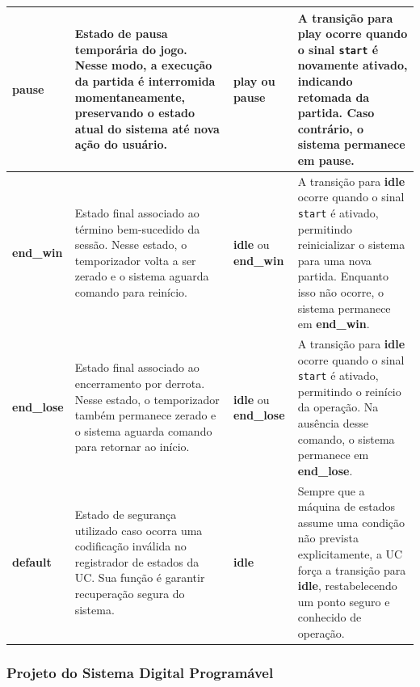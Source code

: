 \documentclass[a4paper,12pt,twoside]{article}
\begin{document}
\begin{longtable}{|>{\centering\arraybackslash}p{}|>{\centering\arraybackslash}p{}|>{\centering\arraybackslash}p{}|>{\centering\arraybackslash}p{}|}
\textbf{pause} 
& Estado de pausa temporária do jogo. Nesse modo, a execução da partida é interromida momentaneamente, preservando o estado atual do sistema até nova ação do usuário. 
& \textbf{play} ou \textbf{pause} 
& A transição para \textbf{play} ocorre quando o sinal \texttt{start} é novamente ativado, indicando retomada da partida. Caso contrário, o sistema permanece em \textbf{pause}. \\ \hline

\textbf{end\_win} 
& Estado final associado ao término bem-sucedido da sessão. Nesse estado, o temporizador volta a ser zerado e o sistema aguarda comando para reinício. 
& \textbf{idle} ou \textbf{end\_win} 
& A transição para \textbf{idle} ocorre quando o sinal \texttt{start} é ativado, permitindo reinicializar o sistema para uma nova partida. Enquanto isso não ocorre, o sistema permanece em \textbf{end\_win}. \\ \hline

\textbf{end\_lose} 
& Estado final associado ao encerramento por derrota. Nesse estado, o temporizador também permanece zerado e o sistema aguarda comando para retornar ao início. 
& \textbf{idle} ou \textbf{end\_lose} 
& A transição para \textbf{idle} ocorre quando o sinal \texttt{start} é ativado, permitindo o reinício da operação. Na ausência desse comando, o sistema permanece em \textbf{end\_lose}. \\ \hline

\textbf{default} 
& Estado de segurança utilizado caso ocorra uma codificação inválida no registrador de estados da UC. Sua função é garantir recuperação segura do sistema. 
& \textbf{idle} 
& Sempre que a máquina de estados assume uma condição não prevista explicitamente, a UC força a transição para \textbf{idle}, restabelecendo um ponto seguro e conhecido de operação. \\ \hline

\end{longtable}

\subsubsection{Projeto do Sistema Digital
Programável}\label{projeto-do-sistema-digital-programuxe1vel}
\end{document}
